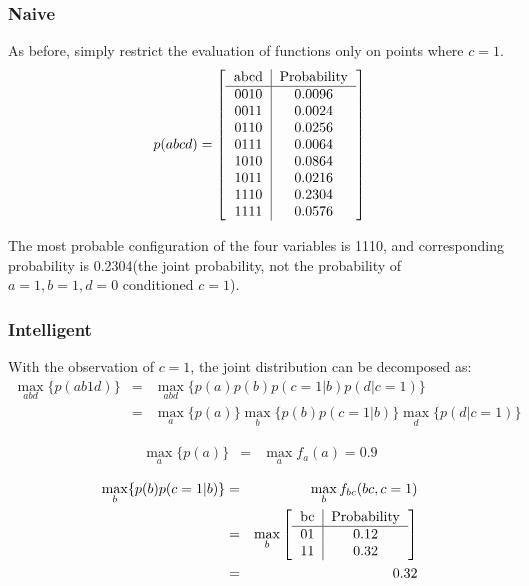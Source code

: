 \documentclass[11pt,a4paper]{article}
\begin{document}
\subsubsection{Naive}
As before, simply restrict the evaluation of functions only 
on points where $c=1$. 
\begin{equation}
p(abcd)=\left[ 
\begin{tabular}{c|c}
abcd & Probability \\
\hline
  0010 & 0.0096 \\ 
  0011 & 0.0024 \\ 
  0110 & 0.0256 \\ 
  0111 & 0.0064 \\ 
  1010 & 0.0864 \\ 
  1011 & 0.0216 \\ 
  1110 & 0.2304 \\ 
  1111 & 0.0576 \\ 
\end{tabular} \right]
\end{equation}

The most probable configuration of the four variables is 1110, and 
corresponding probability is 0.2304(the joint probability, not the probability
of $a=1,b=1,d=0$ conditioned $c=1$). 

\subsubsection{Intelligent}

With the observation of $c=1$, the joint distribution can be decomposed as:
\begin{eqnarray}
\max_{abd} \{ p(ab1d) \} &=& \max_{abd} \{ p(a)p(b)p(c=1|b)p(d|c=1) \} \\
&=& \max_{a} \{ p(a) \} \max_{b} \{p(b)p(c=1|b)\} \max_{d} \{p(d|c=1) \} 
\end{eqnarray}

\begin{eqnarray}
\max_{a} \{ p(a) \} &=& \max_{a}{f_a(a)} = 0.9 
\end{eqnarray}

\begin{eqnarray}
\max_{b} \{p(b)p(c=1|b) \} &=& 
\max_{b} f_{bc}(bc,c=1) \\
&=&\max_{b} \left[ 
\begin{tabular}{c|c}
bc & Probability \\
\hline
  01 &   0.12\\
  11 &   0.32\\
\end{tabular} \right] \\
&=& 0.32 
\end{eqnarray}
\end{document}
